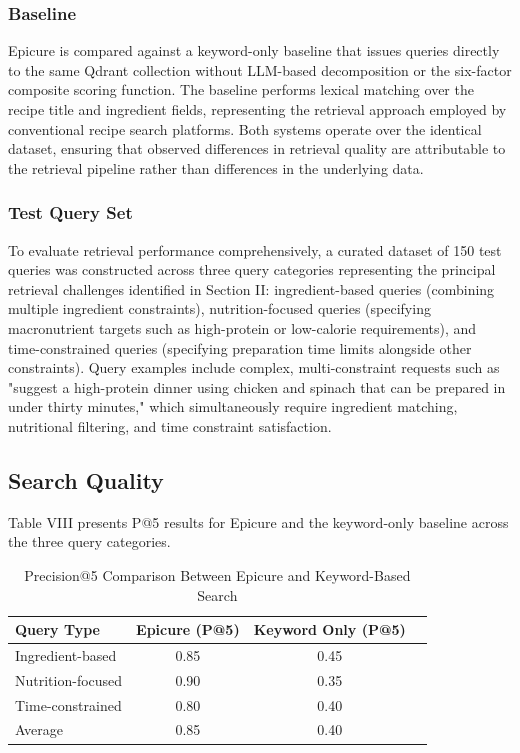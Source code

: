 \documentclass[conference]{IEEEtran}
\begin{document}
\subsubsection{Baseline}
Epicure is compared against a keyword-only baseline that issues queries directly to the same Qdrant collection without LLM-based decomposition or the six-factor composite scoring function. The baseline performs lexical matching over the recipe title and ingredient fields, representing the retrieval approach employed by conventional recipe search platforms. Both systems operate over the identical dataset, ensuring that observed differences in retrieval quality are attributable to the retrieval pipeline rather than differences in the underlying data.

\subsubsection{Test Query Set}
To evaluate retrieval performance comprehensively, a curated dataset of 150 test queries was constructed across three query categories representing the principal retrieval challenges identified in Section II: ingredient-based queries (combining multiple ingredient constraints), nutrition-focused queries (specifying macronutrient targets such as high-protein or low-calorie requirements), and time-constrained queries (specifying preparation time limits alongside other constraints). Query examples include complex, multi-constraint requests such as "suggest a high-protein dinner using chicken and spinach that can be prepared in under thirty minutes," which simultaneously require ingredient matching, nutritional filtering, and time constraint satisfaction.

\subsection{Search Quality}
Table VIII presents P@5 results for Epicure and the keyword-only baseline across the three query categories.
\begin{table}[h]
\centering
\caption{Precision@5 Comparison Between Epicure and Keyword-Based Search}
\label{tab:precision_comparison}
\begin{tabular}{lccc}
\toprule
\textbf{Query Type} & \textbf{Epicure (P@5)} & \textbf{Keyword Only (P@5)} \\
\midrule
Ingredient-based   & 0.85 & 0.45 \\
Nutrition-focused & 0.90 & 0.35 \\
Time-constrained  & 0.80 & 0.40 \\
Average           & 0.85 & 0.40 \\
\bottomrule
\end{tabular}
\end{table}
\end{document}
